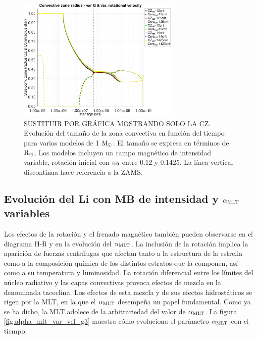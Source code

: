 \begin{figure}
	\centering
	\includegraphics[width=0.7\textwidth]{img/paper2/cz_var_vel_var_g3.pdf}
	\caption{SUSTITUIR POR GRÁFICA MOSTRANDO SOLO LA CZ. Evolución del tamaño de la zona convectiva en función del tiempo para varios modelos de 1 $\mathrm{M}_\odot$. El tamaño se expresa en términos de $\mathrm{R}_\odot$. Los modelos incluyen un campo magnético de intensidad variable, rotación inicial con $\omega_{\mathrm{0}}$ entre 0.12 y 0.1425. La línea vertical discontinua hace referencia a la ZAMS.}
	\label{fig:cz_var_vel_var_g3}
\end{figure}


\subsection{Evolución del Li con MB de intensidad y $\alpha_{\mathrm{MLT}}$ variables}
Los efectos de la rotación y el frenado magnético también pueden observarse en el diagrama H-R y en la evolución del $\alpha_{\mathrm{MLT}}$. La inclusión de la rotación implica la aparición de fuerzas centrífugas que afectan tanto a la estructura de la estrella como a la composición química de los distintos estratos que la componen, así como a su temperatura y luminosidad. La rotación diferencial entre los límites del núcleo radiativo y las capas convectivas provoca efectos de mezcla en la denominada tacoclina. Los efectos de esta mezcla y de sus efectos hidrostáticos se rigen por la MLT, en la que el $\alpha_{\mathrm{MLT}}$ desempeña un papel fundamental. Como ya se ha dicho, la MLT adolece de la arbitrariedad del valor de $\alpha_{\mathrm{MLT}}$. La figura \ref{fig:alpha_mlt_var_vel_g3} muestra cómo evoluciona el parámetro $\alpha_{\mathrm{MLT}}$ con el tiempo.\par 

